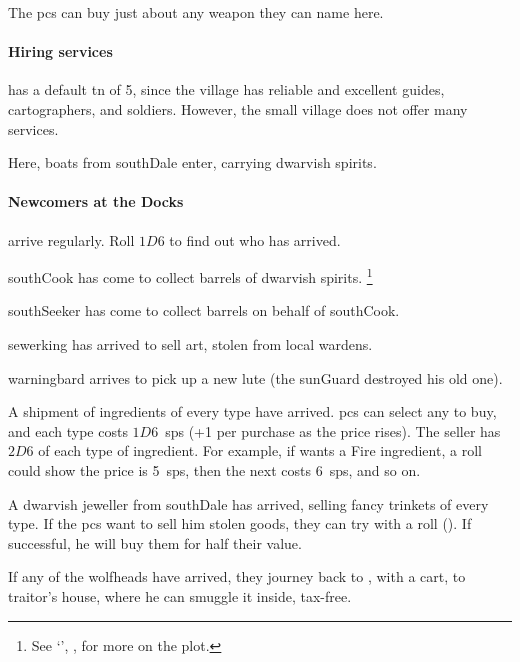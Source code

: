 \begin{multicols}{2}

The \glspl{pc} can buy just about any weapon they can name here.

\paragraph{Hiring services}
has a default \gls{tn} of 5, since the \gls{village} has reliable and excellent guides, cartographers, and soldiers.
However, the small \gls{village} does not offer many services.


Here, boats from \gls{southDale} enter, carrying dwarvish spirits.

\paragraph{Newcomers at the Docks}
arrive regularly.
Roll $1D6$ to find out who has arrived.

\begin{dlist}
  \item
  \Gls{southCook} has come to collect barrels of dwarvish spirits.%
  \footnote{See `', , for more on the plot.}
  \item
  \Gls{southSeeker} has come to collect barrels on behalf of \gls{southCook}.
  \item
  \Gls{sewerking} has arrived to sell art, stolen from local \glspl{warden}.
  \item
  \Gls{warningbard} arrives to pick up a new lute (the \gls{sunGuard} destroyed his old one).
  \item
  A shipment of \glspl{ingredient} of every type have arrived.
  \Glspl{pc} can select any to buy, and each type costs $1D6$~\glspl{sp} (+1 per purchase as the price rises).
  The seller has $2D6$ of each type of \gls{ingredient}.
  For example, if  wants a Fire \gls{ingredient}, a roll could show the price is 5~\glspl{sp}, then the next costs 6~\glspl{sp}, and so on.
  \item
  A dwarvish jeweller from \gls{southDale} has arrived, selling fancy trinkets of every type.
  If the \glspl{pc} want to sell him stolen goods, they can try with a  roll (\tn[12]).
  If successful, he will buy them for half their value.
\end{dlist}


If any of the \glspl{wolfhead} have arrived, they journey back to , with a cart, to \gls{traitor}'s house, where he can smuggle it inside, tax-free.


\end{multicols}
